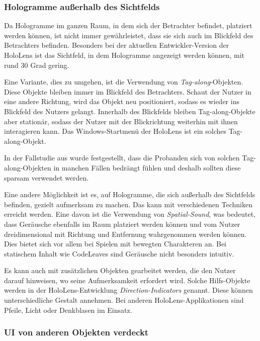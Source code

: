 \subsubsection*{Hologramme außerhalb des Sichtfelds}

Da Hologramme im ganzen Raum, in dem sich der Betrachter befindet, platziert werden können, ist nicht immer gewährleistet, dass sie sich auch im Blickfeld des Betrachters befinden. Besonders bei der aktuellen Entwickler-Version der HoloLens ist das Sichtfeld, in dem Hologramme angezeigt werden können, mit rund 30 Grad \cite{czerulla2017microsoft} gering.

Eine Variante, dies zu umgehen, ist die Verwendung von \textit{Tag-along}-Objekten. Diese Objekte bleiben immer im Blickfeld des Betrachters. Schaut der Nutzer in eine andere Richtung, wird das Objekt neu positioniert, sodass es wieder ins Blickfeld des Nutzers gelangt. Innerhalb des Blickfelds bleiben Tag-along-Objekte aber stationär, sodass der Nutzer mit der Blickrichtung weiterhin mit ihnen interagieren kann. Das Windows-Startmenü der HoloLens ist ein solches Tag-along-Objekt.

In der Fallstudie aus \cite{windows2017casestudy3} wurde festgestellt, dass die Probanden sich von solchen Tag-along-Objekten in manchen Fällen bedrängt fühlen und  deshalb sollten diese sparsam verwendet werden.

Eine andere Möglichkeit ist es, auf Hologramme, die sich außerhalb des Sichtfelds befinden, gezielt aufmerksam zu machen. Das kann mit verschiedenen Techniken erreicht werden. Eine davon ist die Verwendung von \textit{Spatial-Sound}, was bedeutet, dass Geräusche ebenfalls im Raum platziert werden können und vom Nutzer dreidimensional mit Richtung und Entfernung wahrgenommen werden können. Dies bietet sich vor allem bei Spielen mit bewegten Charakteren an. Bei statischem Inhalt wie CodeLeaves sind Geräusche nicht besonders intuitiv.

Es kann auch mit zusätzlichen Objekten gearbeitet werden, die den Nutzer darauf hinweisen, wo seine Aufmerksamkeit erfordert wird. Solche Hilfs-Objekte werden in der HoloLens-Entwicklung \textit{Direction-Indicators} genannt. Diese können unterschiedliche Gestalt annehmen. Bei anderen HoloLens-Applikationen sind Pfeile, Licht oder Denkblasen im Einsatz.

\subsubsection*{UI von anderen Objekten verdeckt}


